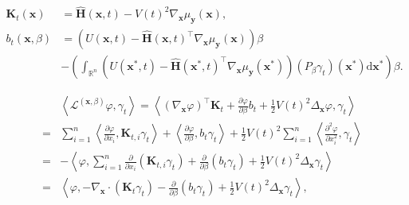 \documentclass[10pt,a4paper]{amsart}
\newcommand{\Ls}{\mathcal{L}}
\newcommand{\dif}{{\mathrm{d}}}
\def\mH{{\bm{H}}}
\def\mK{{\bm{K}}}
\def\vx{{\bm{x}}}
\def\vy{{\bm{y}}}
\begin{document}
    \begin{equation}
    \label{eqn: notation for the sde drifts}
    \begin{aligned}
    \mK_t(\vx) &= \widehat{\mH}(\vx,t)-V(t)^2\nabla_{\vx}\mu_{\vy}(\vx),\\
    b_t(\vx,\beta) &= \left(U(\vx,t) - \widehat{\mH}(\vx,t)^\intercal\nabla_{\vx}\mu_{\vy}(\vx)\right)\beta\\
    &- \left(\int_{\mathbb{R}^n}\left(U(\vx^\ast,t) - \widehat{\mH}(\vx^\ast,t)^\intercal\nabla_{\vx}\mu_{\vy}(\vx^\ast)\right)\left(P_{\beta}\gamma_t\right)(\vx^\ast)\dif \vx^\ast\right)\beta.
    \end{aligned}
    \end{equation}

    \begin{equation}
    \label{eqn: derivation of weak form for joint density}
    \begin{aligned}
    &\left\langle\Ls^{(\vx,\beta)}\varphi, \gamma_t\right\rangle = \left\langle\left(\nabla_{\vx}\varphi\right)^\intercal\mK_t + \frac{\partial \varphi}{\partial \beta}b_t + \frac{1}{2}V(t)^2\Delta_{\vx}\varphi, \gamma_t\right\rangle\\
    =& \sum_{i=1}^{n}\left\langle\frac{\partial \varphi}{\partial x_i},\mK_{t,i} \gamma_{t} \right\rangle + \left\langle\frac{\partial \varphi}{\partial \beta},b_t\gamma_{t} \right\rangle + \frac{1}{2}V(t)^2\sum_{i=1}^{n}\left\langle\frac{\partial^2 \varphi}{\partial x_i^2}, \gamma_{t} \right\rangle\\
    =& -\left\langle\varphi, \sum_{i=1}^{n}\frac{\partial}{\partial x_i}\left(\mK_{t,i} \gamma_{t}\right) + \frac{\partial}{\partial \beta}\left(b_t \gamma_{t}\right) + \frac{1}{2}V(t)^2\Delta_{\vx}\gamma_{t} \right\rangle\\
    =& \left\langle\varphi, -\nabla_{\vx} \cdot \left(\mK_{t}\gamma_t\right) - \frac{\partial}{\partial \beta}\left(b_t \gamma_t\right)+\frac{1}{2}V(t)^2\Delta_{\vx}\gamma_t\right\rangle,
    \end{aligned}    
    \end{equation}
\end{document}
